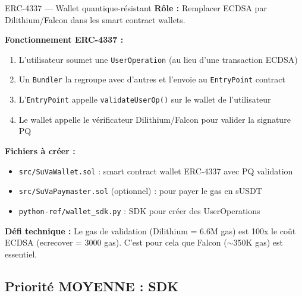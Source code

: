 \documentclass[12pt, a4paper]{article}
\begin{document}
\begin{todo}{ERC-4337 --- Wallet quantique-résistant}
\textbf{Rôle :} Remplacer ECDSA par Dilithium/Falcon dans les smart contract wallets.

\textbf{Fonctionnement ERC-4337 :}
\begin{enumerate}
  \item L'utilisateur soumet une \texttt{UserOperation} (au lieu d'une transaction ECDSA)
  \item Un \texttt{Bundler} la regroupe avec d'autres et l'envoie au \texttt{EntryPoint} contract
  \item L'\texttt{EntryPoint} appelle \texttt{validateUserOp()} sur le wallet de l'utilisateur
  \item Le wallet appelle le vérificateur Dilithium/Falcon pour valider la signature PQ
\end{enumerate}

\textbf{Fichiers à créer :}
\begin{itemize}
  \item \texttt{src/SuVaWallet.sol} : smart contract wallet ERC-4337 avec PQ validation
  \item \texttt{src/SuVaPaymaster.sol} (optionnel) : pour payer le gas en sUSDT
  \item \texttt{python-ref/wallet\_sdk.py} : SDK pour créer des UserOperations
\end{itemize}

\textbf{Défi technique :} Le gas de validation (Dilithium = 6.6M gas) est 100x le coût ECDSA (ecrecover = 3000 gas). C'est pour cela que Falcon ($\sim$350K gas) est essentiel.
\end{todo}

\subsection{Priorité MOYENNE : SDK}
\end{document}
